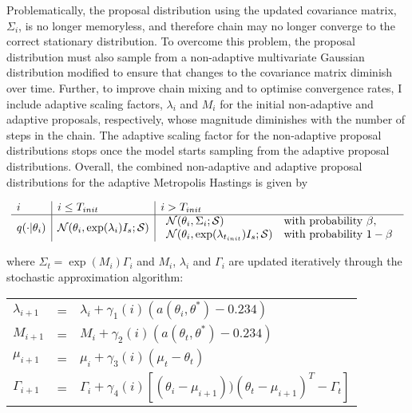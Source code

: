 \documentclass{article}
\begin{document}
Problematically, the proposal distribution using the updated covariance matrix, $\Sigma_i$, is no longer memoryless, and therefore chain may no longer converge to the correct stationary distribution. To overcome this problem, the proposal distribution must also sample from a non-adaptive multivariate Gaussian distribution modified to ensure that changes to the covariance matrix diminish over time. Further, to improve chain mixing and to optimise convergence rates, I include adaptive scaling factors, $\lambda_i$ and $M_i$ for the initial non-adaptive and adaptive proposals, respectively, whose magnitude diminishes with the number of steps in the chain. The adaptive scaling factor for the non-adaptive proposal distributions stops once the model starts sampling from the adaptive proposal distributions. Overall, the combined non-adaptive and adaptive proposal distributions for the adaptive Metropolis Hastings is given by

\begin{equation}
\begin{array}{l | l | l}
\label{eq:proposal}

i & i \leq T_{init} & i > T_{init} \\ \hline
q(\cdot|\theta_i)&\mathcal{N}(\theta_i, \exp(\lambda_i)I_{s};\mathcal{S})  &


\begin{array}{ll}
\mathcal{N}(\theta_i, \Sigma_i;\mathcal{S}) & \text{with probability }\beta, \\
\mathcal{N}(\theta_i, \exp(\lambda_{t_{init}})I_{s};\mathcal{S}) & \text{with probability }1 - \beta \\ 
\end{array}
 \end{array}
 \end{equation}
 
 
where $\Sigma_t = \exp(M_i)\Gamma_i$ and $M_{i}$, $\lambda_i$ and $\Gamma_{i}$ are updated iteratively through the stochastic approximation algorithm:
 \begin{center}
 \begin{tabular}{l l l}
  $\lambda_{i+1}$ & = & $ \lambda_i + \gamma_1(i)(a(\theta_i, \theta^*) - 0.234) $\\
 $M_{i+1}$& = & $M_i + \gamma_2(i)(a(\theta_t, \theta^*)- 0.234) $ \\
 $\mu_{i+1}$ & = & $\mu_i + \gamma_3(i)(\mu_t - \theta_t) $ \\
 $\Gamma_{i+1}$ & = & $ \Gamma_i + \gamma_4(i)[(\theta_i - \mu_{i+1}))(\theta_t - \mu_{i+1})^T - \Gamma_t]$ \\
\end{tabular} 
 \end{center}
 
\end{document}
